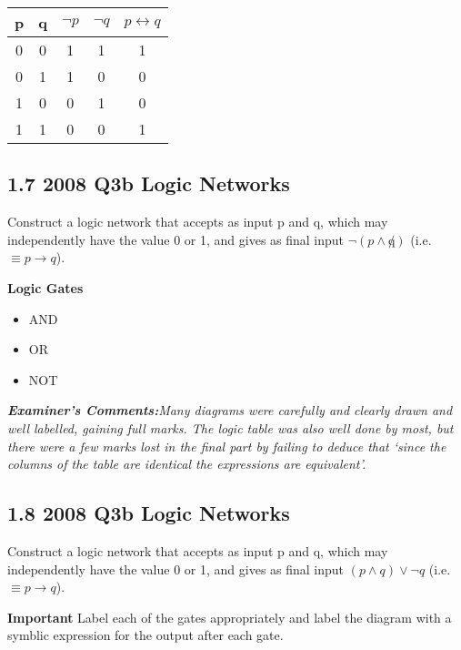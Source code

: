\documentclass{article}
\begin{document}
\begin{center}
\begin{tabular}{|c|c|c|c|c|}
\hline  p& q & $\neg p$ & $\neg q$ & $p \leftrightarrow q$ \\ 
\hline  0& 0 & 1& 1 & 1\\ 
\hline  0& 1 &  1& 0& 0\\ 
\hline  1& 0 &  0& 1& 0\\ 
\hline  1& 1 &  0 & 0& 1\\ 
\hline 
\end{tabular} 
\newpage
\subsection*{1.7 2008 Q3b Logic Networks }

Construct a logic network that accepts as input p and q, which may independently have the value 0 or 1, and
gives as final input $\neg(p \wedge \not q)$ (i.e. $\equiv p \rightarrow q$).\\
\bigskip

\textbf{Logic Gates}
\begin{itemize}
\item AND
\item OR
\item NOT
\end{itemize}
\bigskip

\emph{\textbf{Examiner's Comments:}Many
diagrams were carefully and clearly drawn and well labelled, gaining full
marks. The logic table was also well done by most, but there were a few marks
lost in the final part by failing to deduce that ‘since the columns of the table are
identical the expressions are equivalent’.}

\subsection*{1.8 2008 Q3b Logic Networks }
Construct a logic network that accepts as input p and q, which may independently have the value 0 or 1, and
gives as final input $(p \wedge  q) \vee \neg q$ (i.e. $\equiv p \rightarrow q$).



\textbf{Important} Label each of the gates appropriately and label the diagram with a symblic expression for the output after each gate.



\end{center}
\end{document}
